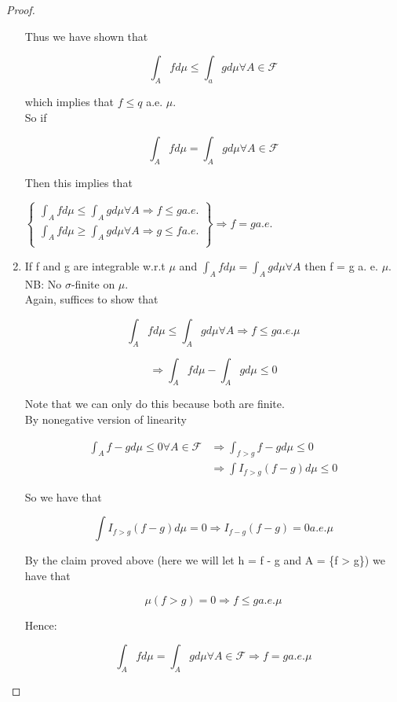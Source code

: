 \documentclass[11pt,fleqn]{book} %
\begin{document}
\begin{proof}
\begin{enumerate}
 Thus we have shown that

		$$\int_A f d\mu \leq \int_a g d\mu \forall A \in \mathcal{F} $$

which implies that $f \leq q$ a.e. $\mu$. \\

So if 

		$$\int_A f d\mu = \int_A g d\mu \forall A \in \mathcal{F} $$

Then this implies that

		$\left\{ \begin{array}{l}
					\int_A f d\mu \leq \int_A g d\mu \forall A \Rightarrow f \leq g a.e.\\
					\int_A f d\mu \geq \int_A g d\mu \forall A \Rightarrow g \leq f a.e. \\
				\end{array}\right\} \Rightarrow f = g a.e. $

\item If f and g are integrable w.r.t $\mu$ and $\int_A f d\mu = \int_A g d\mu \forall A$ then f = g a. e. $\mu$. NB: No $\sigma$-finite on $\mu$.\\

Again, suffices to show that

		$$\int_A f d\mu \leq \int_A g d\mu \forall A  \Rightarrow f \leq g a.e. \mu$$

		$$\Rightarrow \int_A f d\mu - \int_A g d\mu \leq 0$$

Note that we can only do this because both are finite. \\

By nonegative version of linearity 

		\begin{align*}
			\int_A f- g d\mu \leq 0 \forall A \in \mathcal{F} &\Rightarrow \int_{f > g} f - g d\mu \leq 0\\
					&\Rightarrow \int I_{f > g} (f - g) d \mu \leq 0
		\end{align*}

So we have that 

		$$ \int I_{f > g} (f - g) d \mu = 0 \Rightarrow I_{f-g}(f-g) = 0 a.e. \mu$$

By the claim proved above (here we will let h = f - g and A = \{f > g\}) we have that

		$$ \mu(f > g) = 0 \Rightarrow f \leq g a.e. \mu$$

Hence: 

		$$\int_A f d\mu = \int_A g d\mu \forall A \in \mathcal{F} \Rightarrow f =g a.e. \mu$$



\end{enumerate}
\end{proof}
\end{document}
